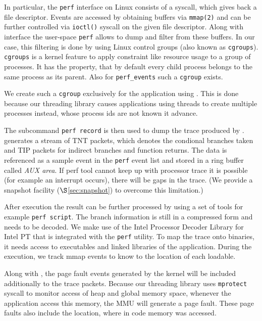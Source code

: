  

In particular, the {\tt perf} interface on Linux consists of a syscall, which gives back a file
descriptor. Events are accessed by obtaining buffers via {\tt mmap(2)} and can be
further controlled via {\tt ioctl()} syscall on the given file descriptor. Along with
interface the user-space {\tt perf} allows to dump and filter from these
buffers. In our case, this filtering is done by using Linux control
groups (also known as {\tt cgroups}). {\tt cgroups} is a kernel feature to apply constraint
like resource usage to a group of processes. It has the property, that by
default every child process belongs to the same process as its parent. Also for
{\tt perf\_events} such a {\tt cgroup} exists.

We create such a {\tt cgroup} exclusively for the application using \projecttitle. This is done because
our threading library causes applications using threads to create multiple
processes instead, whose process ids are not known it advance.

The subcommand {\tt perf record} is then used to dump the trace produced by \intelpt.
\intelpt generates a stream of TNT packets, which denotes the
condional branches taken and TIP packets for indirect branches and function
returns. The data is referenced as a sample event in the {\tt perf} event list and
stored in a ring buffer called \emph{AUX area}. If perf tool cannot
keep up with processor trace it is possible (for example an interrupt occurs),
there will be gaps in the trace. %
(We provide a snapshot facility ($\S$\ref{sec:snapshot}) to overcome this limitation.)


After execution the result can be further processed by using a set of tools
for example {\tt perf script}. The branch information is still in a compressed
form and needs to be decoded. We make use of the Intel Processor Decoder Library for Intel PT  that is integrated with the {\tt perf} utility.%
To map the trace onto binaries, it needs access to executables and linked
libraries of the application. During the execution, we track mmap events to
know to the location of each loadable.



Along with \intelpt, the page fault events generated by the kernel will be included
additionally to the trace packets. Because our threading library uses {\tt mprotect}
syscall to monitor access of heap and global memory space, whenever the
application access this memory, the MMU will generate a page fault. These
page faults also include the location, where in code memory was accessed.

